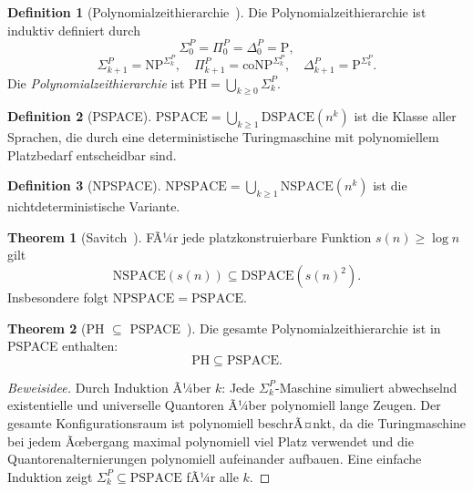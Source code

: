 ﻿\documentclass[a4paper,12pt]{article}
\theoremstyle{definition}
\newtheorem{definition}{Definition}
\newtheorem{theorem}{Theorem}
\begin{document}
\begin{definition}[Polynomialzeithierarchie~\cite{stockmeyer1976poly}]
  Die Polynomialzeithierarchie ist induktiv definiert durch
  \[
    \Sigma_0^P = \Pi_0^P = \Delta_0^P = \mathrm{P},
  \]
  \[
    \Sigma_{k+1}^P = \mathrm{NP}^{\Sigma_k^P}, \quad
    \Pi_{k+1}^P = \mathrm{coNP}^{\Sigma_k^P}, \quad
    \Delta_{k+1}^P = \mathrm{P}^{\Sigma_k^P}.
  \]
  Die \emph{Polynomialzeithierarchie} ist $\mathrm{PH} = \bigcup_{k \geq 0} \Sigma_k^P$.
\end{definition}

\begin{definition}[PSPACE]
  $\mathrm{PSPACE} = \bigcup_{k \geq 1} \mathrm{DSPACE}(n^k)$ ist die Klasse
  aller Sprachen, die durch eine deterministische Turingmaschine mit
  polynomiellem Platzbedarf entscheidbar sind.
\end{definition}

\begin{definition}[NPSPACE]
  $\mathrm{NPSPACE} = \bigcup_{k \geq 1} \mathrm{NSPACE}(n^k)$ ist die
  nichtdeterministische Variante.
\end{definition}

\begin{theorem}[Savitch~\cite{savitch1970relationships}]
\label{thm:savitch}
  FÃ¼r jede platzkonstruierbare Funktion $s(n) \geq \log n$ gilt
  \[
    \mathrm{NSPACE}(s(n)) \subseteq \mathrm{DSPACE}(s(n)^2).
  \]
  Insbesondere folgt $\mathrm{NPSPACE} = \mathrm{PSPACE}$.
\end{theorem}

\begin{theorem}[PH $\subseteq$ PSPACE~\cite{papadimitriou1994complexity}]
\label{thm:ph_pspace}
  Die gesamte Polynomialzeithierarchie ist in PSPACE enthalten:
  \[
    \mathrm{PH} \subseteq \mathrm{PSPACE}.
  \]
\end{theorem}

\begin{proof}[Beweisidee]
  Durch Induktion Ã¼ber $k$: Jede $\Sigma_k^P$-Maschine simuliert
  abwechselnd existentielle und universelle Quantoren Ã¼ber polynomiell
  lange Zeugen. Der gesamte Konfigurationsraum ist polynomiell beschrÃ¤nkt,
  da die Turingmaschine bei jedem Ãœbergang maximal polynomiell viel Platz
  verwendet und die Quantorenalternierungen polynomiell aufeinander aufbauen.
  Eine einfache Induktion zeigt $\Sigma_k^P \subseteq \mathrm{PSPACE}$ fÃ¼r alle $k$.
\end{proof}

\end{document}
